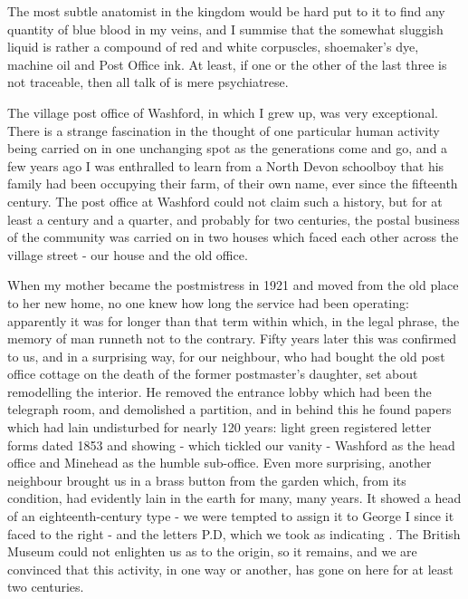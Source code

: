 
The most subtle anatomist in the kingdom would be hard put to it to find any quantity of blue blood in my veins, and I summise that the somewhat sluggish liquid is rather a compound of red and white corpuscles, shoemaker's dye, machine oil and Post Office ink. At least, if one or the other of the last three is not traceable, then all talk of  is mere psychiatrese.

The village post office of Washford, in which I grew up, was very exceptional. There is a strange fascination in the thought of one particular human activity being carried on in one unchanging spot as the generations come and go, and a few years ago I was enthralled to learn from a North Devon schoolboy that his family had been occupying their farm, of their own name, ever since the fifteenth century. The post office at Washford could not claim such a history, but for at least a century and a quarter, and probably for two centuries, the postal business of the community was carried on in two houses which faced each other across the village street - our house and the old office.

When my mother became the postmistress in 1921 and moved from the old place to her new home, no one knew how long the service had been operating: apparently it was for longer than that term within which, in the legal phrase, the memory of man runneth not to the contrary. Fifty years later this was confirmed to us, and in a surprising way, for our neighbour, who had bought the old post office cottage on the death of the former postmaster's daughter, set about remodelling the interior. He removed the entrance lobby which had been the telegraph room, and demolished a partition, and in behind this he found papers which had lain undisturbed for nearly 120 years: light green registered letter forms dated 1853 and showing - which tickled our vanity - Washford as the head office and Minehead as the humble sub-office. Even more surprising, another neighbour brought us in a brass button from the garden which, from its condition, had evidently lain in the earth for many, many years. It showed a head of an eighteenth-century type - we were tempted to assign it to George I since it faced to the right - and the letters P.D, which we took as indicating . The British Museum could not enlighten us as to the origin, so  it remains, and we are convinced that this activity, in one way or another, has gone on here for at least two centuries.

